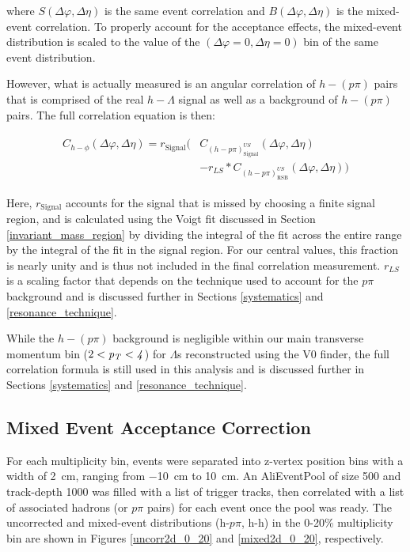 \documentclass[ALICE,manyauthors]{ALICE_analysis_notes}
\begin{document}
where $S(\Delta\varphi, \Delta\eta)$ is the same event correlation and $B(\Delta\varphi, \Delta\eta)$ is the mixed-event correlation.  To properly account for the acceptance effects, the mixed-event distribution is scaled to the value of the $(\Delta\varphi = 0, \Delta\eta = 0)$ bin of the same event distribution. 


However, what is actually measured is an angular correlation of $h-(p\pi)$ pairs that is comprised of the real $h-\Lambda$ signal as well as a background of $h-(p\pi)$ pairs. The full correlation equation is then:

\begin{align}
\label{corrEq_withBG}
\begin{split}
    C_{h-\phi}(\Delta\varphi, \Delta\eta) = r_{\text{Signal}}\biggl(&C_{(h-p\pi)^{US}_{\text{Signal}}}(\Delta\varphi, \Delta\eta)\\
    &- r_{LS}*C_{(h-p\pi)^{US}_{\text{RSB}}}(\Delta\varphi, \Delta\eta)\biggr)
\end{split}
\end{align}

Here, $r_{\text{Signal}}$ accounts for the signal that is missed by choosing a finite signal region, and is calculated using the Voigt fit discussed in Section \ref{invariant_mass_region} by dividing the integral of the fit across the entire range by the integral of the fit in the signal region. For our central values, this fraction is nearly unity and is thus not included in the final correlation measurement. $r_{LS}$ is a scaling factor that depends on the technique used to account for the $p\pi$ background and is discussed further in Sections \ref{systematics} and \ref{resonance_technique}.


While the $h-(p\pi)$ background is negligible within our main transverse momentum bin ($2 < \it{p}_{T} < 4$) for $\Lambda$s reconstructed using the V0 finder, the full correlation formula is still used in this analysis and is discussed further in Sections \ref{systematics} and \ref{resonance_technique}.

\subsection{Mixed Event Acceptance Correction}

For each multiplicity bin, events were separated into z-vertex position bins with a width of \SI{2}{cm}, ranging from \SI{-10}{cm} to \SI{10}{cm}. An AliEventPool of size 500 and track-depth 1000 was filled with a list of trigger tracks, then correlated with a list of associated hadrons (or $p\pi$ pairs) for each event once the pool was ready. The uncorrected and mixed-event distributions (h-$p\pi$, h-h) in the 0-20\% multiplicity bin are shown in Figures \ref{uncorr2d_0_20} and \ref{mixed2d_0_20}, respectively.
\end{document}
